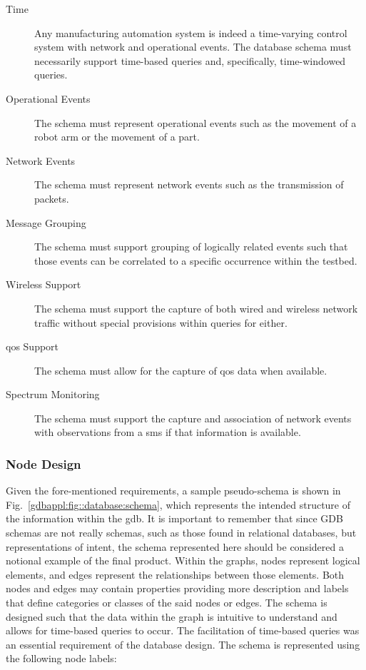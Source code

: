 \begin{description}%
\item[Time] Any manufacturing automation system is indeed a time-varying control system with network and operational events.  The database schema must necessarily support time-based queries and, specifically, time-windowed 
queries.
\item[Operational Events] The schema must represent operational events such as the movement of a robot arm or the movement of a part.
\item[Network Events] The schema must represent network events such as the transmission of packets.
\item[Message Grouping]  The schema must support grouping of logically related events such that those events can be correlated to a specific occurrence within the testbed.
\item[Wireless Support] The schema must support the capture of both wired and wireless network traffic without special provisions within queries for either.
\item[\Gls{qos} Support] The schema must allow for the capture of \gls{qos} data when available.
\item[Spectrum Monitoring] The schema must support the capture and association of network events with observations from a \gls{sms} if that information is available.
\end{description}

\subsubsection{Node Design}

Given the fore-mentioned requirements, a sample pseudo-schema is shown in Fig.~\ref{gdbappl:fig::database:schema}, which represents the intended structure of the information within the \gls{gdb}. It is important to remember that since GDB schemas are not really schemas, such as those found in relational databases, but representations of intent, the schema represented here should be considered a notional example of the final product.  Within the graphs, nodes represent logical elements, and edges represent the relationships between those elements.  Both nodes and edges may contain properties providing more description and labels that define categories or classes of the said nodes or edges.  The schema is designed such that the data within the graph is intuitive to understand and allows for time-based queries to occur.  The facilitation of time-based queries was an essential requirement of the database design.  The schema is represented using the following node labels:

